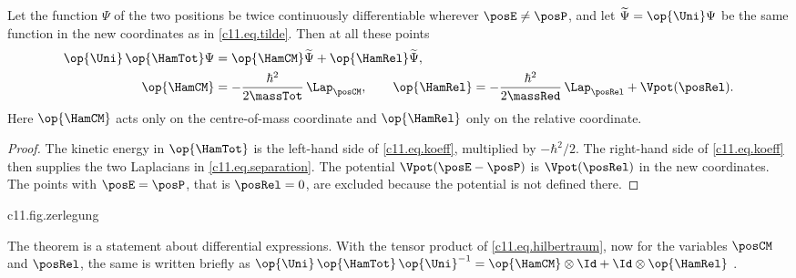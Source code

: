 \begin{theorem}\label{c11.thm.separation}
  Let the function $\Psi$ of the two positions be twice continuously differentiable
  wherever $\posE \neq \posP$, and let $\widetilde{\Psi} = \op{\Uni}\Psi$ be the same function
  in the new coordinates as in \eqref{c11.eq.tilde}. Then at all these points
  \begin{equation}\label{c11.eq.separation}
    \begin{aligned}
      \op{\Uni}\,\op{\HamTot}\Psi &= \op{\HamCM}\widetilde{\Psi} + \op{\HamRel}\widetilde{\Psi}, \\
      \op{\HamCM} &= -\frac{\hbar^2}{2\massTot}\,\Lap_{\posCM},
      \qquad
      \op{\HamRel} = -\frac{\hbar^2}{2\massRed}\,\Lap_{\posRel} + \Vpot(\posRel).
    \end{aligned}
  \end{equation}
  Here $\op{\HamCM}$ acts only on the centre-of-mass coordinate and $\op{\HamRel}$ only on the
  relative coordinate.
\end{theorem}
\begin{proof}
  The kinetic energy in $\op{\HamTot}$ is the left-hand side of \eqref{c11.eq.koeff},
  multiplied by $-\hbar^2/2$. The right-hand side of \eqref{c11.eq.koeff} then supplies
  the two Laplacians in \eqref{c11.eq.separation}. The potential $\Vpot(\posE - \posP)$ is
  $\Vpot(\posRel)$ in the new coordinates. The points with $\posE = \posP$, that is
  $\posRel = 0$, are excluded because the potential is not defined there.
\end{proof}

\begin{tpcfigure}{c11.fig.zerlegung}
  \caption{Theorem~\ref{c11.thm.separation} as a diagram; the lengths in the picture mean nothing. Left, the atom as it stands: two particles, coupled by the potential. Right, the same system in the new coordinates: a free particle of mass $\massTot$ and, independently of it, one particle of mass $\massRed$ in the potential $\Vpot$.}
\end{tpcfigure}

The theorem is a statement about differential expressions. With the tensor product of
\eqref{c11.eq.hilbertraum}, now for the variables $\posCM$ and $\posRel$, the same is
written briefly as $\op{\Uni}\,\op{\HamTot}\,\op{\Uni}^{-1} = \op{\HamCM} \otimes \Id + \Id \otimes \op{\HamRel}$
.

